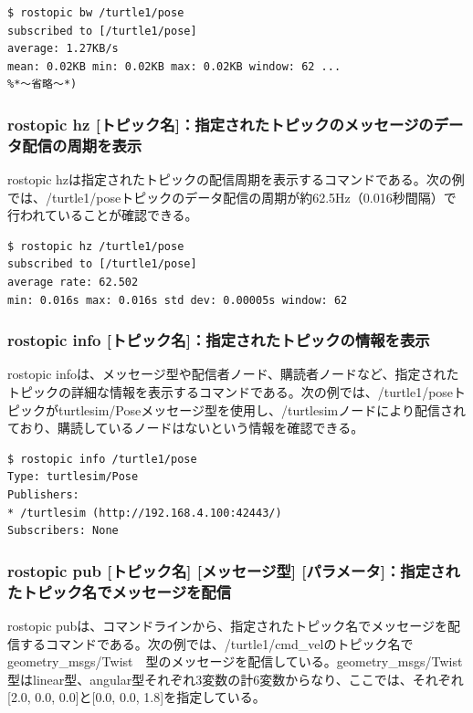 \begin{lstlisting}[language=ROS]
$ rostopic bw /turtle1/pose
subscribed to [/turtle1/pose]
average: 1.27KB/s
mean: 0.02KB min: 0.02KB max: 0.02KB window: 62 ...
%*〜省略〜*)
\end{lstlisting}

\subsubsection{rostopic hz [トピック名]：指定されたトピックのメッセージのデータ配信の周期を表示}

rostopic hzは指定されたトピックの配信周期を表示するコマンドである。次の例では、/turtle1/poseトピックのデータ配信の周期が約62.5Hz（0.016秒間隔）で行われていることが確認できる。

\begin{lstlisting}[language=ROS]
$ rostopic hz /turtle1/pose
subscribed to [/turtle1/pose]
average rate: 62.502
min: 0.016s max: 0.016s std dev: 0.00005s window: 62
\end{lstlisting}

\subsubsection{rostopic info [トピック名]：指定されたトピックの情報を表示}

rostopic infoは、メッセージ型や配信者ノード、購読者ノードなど、指定されたトピックの詳細な情報を表示するコマンドである。次の例では、/turtle1/poseトピックがturtlesim/Poseメッセージ型を使用し、/turtlesimノードにより配信されており、購読しているノードはないという情報を確認できる。

\begin{lstlisting}[language=ROS]
$ rostopic info /turtle1/pose
Type: turtlesim/Pose
Publishers:
* /turtlesim (http://192.168.4.100:42443/)
Subscribers: None
\end{lstlisting}

\subsubsection{rostopic pub [トピック名] [メッセージ型] [パラメータ]：指定されたトピック名でメッセージを配信}

rostopic pubは、コマンドラインから、指定されたトピック名でメッセージを配信するコマンドである。次の例では、/turtle1/cmd\_velのトピック名でgeometry\_msgs/Twist　型のメッセージを配信している。geometry\_msgs/Twist 型はlinear型、angular型それぞれ3変数の計6変数からなり、ここでは、それぞれ[2.0, 0.0, 0.0]と[0.0, 0.0, 1.8]を指定している。

